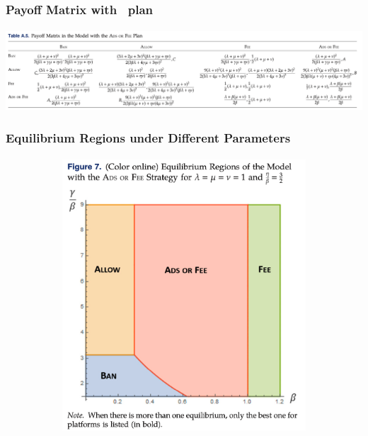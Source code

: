 \documentclass{beamer}
\newcommand{\aof}{\textch{\textcolor{myblue}{Ads or Fee}}}
\begin{document}
\begin{frame}%
    \frametitle{Payoff Matrix with \aof\ plan}
    \framesubtitle{}
    \centering
    \includegraphics[width=1.05\textwidth]{aofpayoff}
\end{frame}

\begin{frame}%
    \frametitle{Equilibrium Regions under Different Parameters}
    \framesubtitle{}
    \begin{figure}
        \centering
        \begin{subfigure}[b]{0.3\textwidth}
            \centering
            \includegraphics[width=\textwidth]{f7}
        \end{subfigure}
        \hfill
        \begin{subfigure}[b]{0.3\textwidth}
            \centering

\end{subfigure}
\end{figure}
\end{frame}
\end{document}
